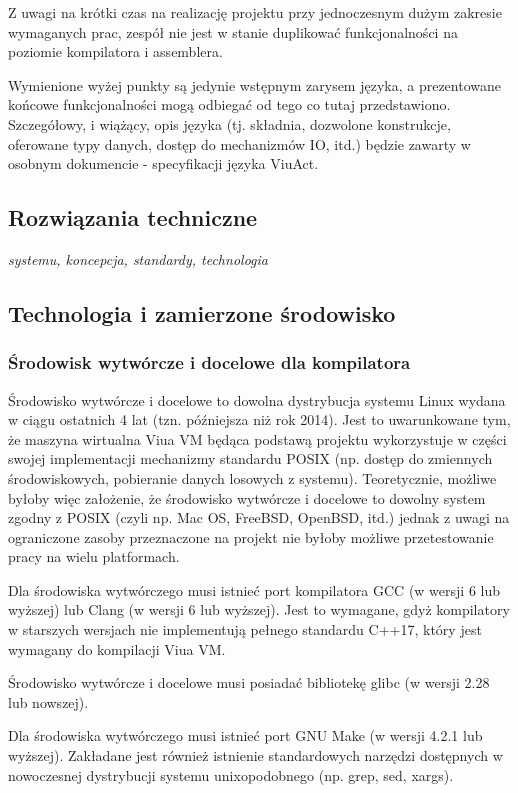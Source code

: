 \documentclass[11pt,oneside,a4paper,titlepage,onecolumn]{article}
\begin{document}
Z uwagi na krótki czas na realizację projektu przy jednoczesnym dużym zakresie wymaganych prac, zespół nie
jest w stanie duplikować funkcjonalności na poziomie kompilatora i assemblera.

Wymienione wyżej punkty są jedynie wstępnym zarysem języka, a prezentowane końcowe funkcjonalności mogą
odbiegać od tego co tutaj przedstawiono. Szczegółowy, i wiążący, opis języka (tj. składnia, dozwolone
konstrukcje, oferowane typy danych, dostęp do mechanizmów IO, itd.) będzie zawarty w osobnym dokumencie -
specyfikacji języka ViuAct.

\subsection{Rozwiązania techniczne}

\emph{systemu, koncepcja, standardy, technologia}

\subsection{Technologia i zamierzone środowisko}

\subsubsection{Środowisk wytwórcze i docelowe dla kompilatora}

Środowisko wytwórcze i docelowe to dowolna dystrybucja systemu Linux wydana w ciągu ostatnich 4 lat (tzn.
późniejsza niż rok 2014). Jest to uwarunkowane tym, że maszyna wirtualna Viua VM będąca podstawą projektu
wykorzystuje w części swojej implementacji mechanizmy standardu POSIX (np. dostęp do zmiennych środowiskowych,
pobieranie danych losowych z systemu). Teoretycznie, możliwe byłoby więc założenie, że środowisko wytwórcze i
docelowe to dowolny system zgodny z POSIX (czyli np. Mac OS, FreeBSD, OpenBSD, itd.) jednak z uwagi na
ograniczone zasoby przeznaczone na projekt nie byłoby możliwe przetestowanie pracy na wielu platformach.

Dla środowiska wytwórczego musi istnieć port kompilatora GCC (w wersji 6 lub wyższej) lub Clang (w wersji 6
lub wyższej). Jest to wymagane, gdyż kompilatory w starszych wersjach nie implementują pełnego standardu
C++17, który jest wymagany do kompilacji Viua VM.

Środowisko wytwórcze i docelowe musi posiadać bibliotekę glibc (w wersji 2.28 lub nowszej).

Dla środowiska wytwórczego musi istnieć port GNU Make (w wersji 4.2.1 lub wyższej). Zakładane jest również
istnienie standardowych narzędzi dostępnych w nowoczesnej dystrybucji systemu unixopodobnego (np. grep, sed,
xargs).
\end{document}
